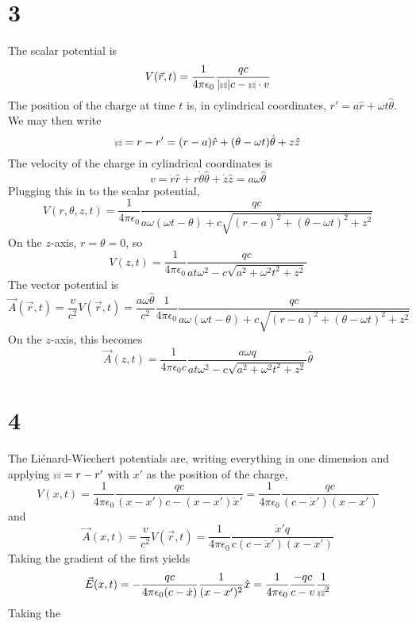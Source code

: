 \documentclass{article}
\def\scriptr{{\mbox{$\resizebox{.09in}{.08in}{\texttt{[image: ScriptR]}}$}}}
\begin{document}
\section*{3}
The scalar potential is
\[V(\vec{r},t)=\frac{1}{4\pi\epsilon_{0}}\frac{qc}{|\scriptr| c-\scriptr\cdot v}\]
The position of the charge at time $t$ is, in cylindrical coordinates, $r'=a\hat{r}+\omega t\hat{\theta}$.
We may then write
\[\scriptr = {r}-r'=(r-a)\hat{r}+(\theta-\omega t)\hat{\theta}+z\hat{z}\]
The velocity of the charge in cylindrical coordinates is
\[v=\dot{r}\hat{r}+r\dot{\theta}\hat{\theta}+\dot{z}\hat{z}=a\omega\hat{\theta}\]
Plugging this in to the scalar potential,
\[
  V(r,\theta,z,t)=\frac{1}{4\pi\epsilon_{0}}\frac{qc}{a\omega(\omega t-\theta)+c\sqrt{(r-a)^{2}+(\theta-\omega t)^{2}+z^{2}}}
\]
On the $z$-axis, $r=\theta=0$, so
\[V(z,t)=\frac{1}{4\pi\epsilon_{0}}\frac{qc}{at\omega^{2}-c\sqrt{a^{2}+\omega^{2}t^{2}+z^{2}}}\]
The vector potential is
\[
  \vec{A}(\vec{r},t)=\frac{v}{c^{2}}V(\vec{r},t)
  =\frac{a\omega\hat{\theta}}{c^{2}}\frac{1}{4\pi\epsilon_{0}}\frac{qc}{a\omega(\omega t-\theta)
    +c\sqrt{(r-a)^{2}+(\theta-\omega t)^{2}+z^{2}}}
\]
On the $z$-axis, this becomes
\[\vec{A}(z,t)=\frac{1}{4\pi\epsilon_{0}c}\frac{a\omega q}{at\omega^{2}-c\sqrt{a^{2}+\omega^{2}t^{2}+z^{2}}}\hat{\theta}\]

\section*{4}
The Li\'enard-Wiechert potentials are, writing everything in one dimension and applying $\scriptr=r-r'$ with $x'$ as the position of the charge,
\[
  V(x,t)=\frac{1}{4\pi\epsilon_{0}}\frac{qc}{(x-x')c-(x-x')\dot{x}'}
  =\frac{1}{4\pi\epsilon_{0}}\frac{qc}{(c-\dot{x}')(x-x')}
\]
and
\[
  \vec{A}(x,t)=\frac{v}{c^{2}}V(\vec{r},t)
  =\frac{1}{4\pi\epsilon_{0}}\frac{\dot{x}'q}{c(c-\dot{x}')({x-x'})}
\]
Taking the gradient of the first yields
\[
  \vec{E}(x,t)=-\frac{qc}{4\pi\epsilon_{0}(c-\dot{x})}\frac{1}{(x-x')^{2}}\hat{x}
  =\frac{1}{4\pi\epsilon_{0}}\frac{-qc}{c-v}\frac{1}{\scriptr^{2}}
\]
Taking the
\end{document}
